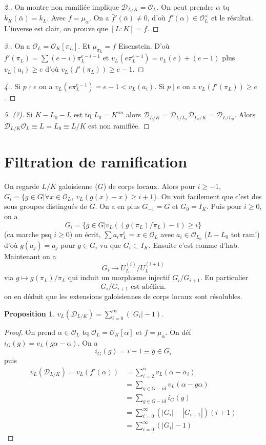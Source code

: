 \documentclass[a4paper,12pt]{book}
\newcommand{\Or}{\mathcal{O}}
\newcommand{\D}{\mathscr{D}}
\theoremstyle{plain}
\newtheorem{prop}{Proposition}
\theoremstyle{definition}
\theoremstyle{remark}
\begin{document}
\begin{proof}[2.]
    On montre non ramifiée implique $\D_{L/K}=\Or_L$. On peut prendre
    $\alpha$ tq $k_K(\bar \alpha)=k_L$. Avec $f=\mu_\alpha$. On a 
    $\bar f'(\bar \alpha)\ne 0$, d'où $f'(\alpha)\in \Or_L^\times$
    et le résultat. L'inverse est clair, on prouve que $[L:K]=f$.
\end{proof}
\begin{proof}[3.]
    On a $\Or_L=\Or_K[\pi_L]$. Et $\mu_{\pi_L}=f$ Eisenstein.
    D'où $f'(\pi_L)=\sum (e-i)\pi_L^{e-i-1}$ et $v_L(e\pi_L^{e-1})=
    v_L(e)+(e-1)$ plus $v_L(a_i)\geq e$ d'où $v_L(f'(\pi_L))\geq e-1$.
    
\end{proof}
\begin{proof}[4.]
    Si $p\nmid e$ on a $v_L(e\pi_L^{e-1})=e-1<v_L(a_i)$. Si $p\mid e$
    on a $v_L(f'(\pi_L))\geq e$.
\end{proof}
\begin{proof}[5. (?)]
    Si $K-L_0-L$ est tq $L_0=K^{un}$ alors $\D_{L/K}=\D_{L/L_0}\D_{L_0/K}=\D_{L/L_0}$.
    Alors $\D_{L/K}\Or_L\equiv L=L_0\equiv L/K$ est non ramifiée.
\end{proof}
\section{Filtration de ramification}
On regarde $L/K$ galoisienne ($G$) de corps locaux. Alors
pour $i\geq -1$, $G_i=\{g\in G|\forall x\in \Or_L,~v_L(g(x)-x)\geq i+1\}$.
On voit facilement que c'est des sous groupes distingués de $G$.
On a en plus $G_{-1}=G$ et $G_0=I_K$. Puis pour $i\geq 0$, on a 
\[G_i=\{g\in G|v_L((g(\pi_L)/\pi_L)-1)\geq i\}\]
(ca marche psq $i\geq 0$)
on écrit, $\sum a_i\pi_L^i=x\in \Or_L$ avec
$a_i\in \Or_{L_0}$ ($L-L_0$ tot ram!) d'où $g(a_j)=a_j$ pour $g\in G_i$
vu que $G_i\subset I_K$. Ensuite c'est comme d'hab.
Maintenant on a 
\[G_i\to U_L^{(i)}/U_L^{(i+1)}\]
via $g\mapsto g(\pi_L)/\pi_L$ qui induit un morphisme
injectif $G_i/G_{i+1}$. En particulier 
\[G_i/G_{i+1}\textrm{ est abélien.}\]
on en déduit que les extensions galoisiennes de corps
locaux sont résolubles.
\begin{prop}
    $v_L(\D_{L/K})=\sum_{i=0}^\infty(|G_i|-1)$.
\end{prop}
\begin{proof}
    On prend $\alpha\in \Or_L$ tq $\Or_L=\Or_K[\alpha]$ et $f=\mu_\alpha$.
    On déf $i_G(g)=v_L(g\alpha-\alpha)$. On a 
    \[i_G(g)=i+1\equiv g\in G_i\]
    puis
    \begin{align*}
    v_L(\D_{L/K})=v_L(f'(\alpha))&=\sum_{i=2}^nv_L(\alpha-\alpha_i)\\
                                 &=\sum_{g\in G-id}v_L(\alpha-g\alpha)\\
                                 &=\sum_{g\in G-id}i_G(g)\\
                                 &=\sum_{i=0}^\infty (|G_i|-|G_{i+1}|)(i+1)\\
                                 &=\sum_{i=0}^\infty(|G_i|-1)
    \end{align*}
\end{proof}
\end{document}
